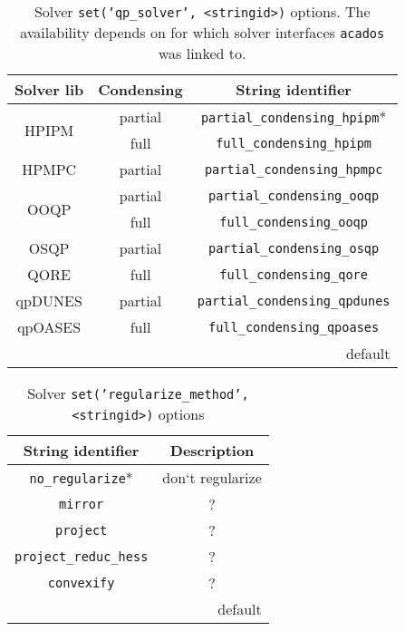 \documentclass[english]{article}
\newcommand{\code}[1]{\texttt{#1}}
\newcommand{\str}[1]{\texttt{'#1'}}
\newcommand{\acados}{\texttt{acados}}
\begin{document}
%
\begin{table}
    \centering
    \caption{Solver \code{set(\str{qp\_solver}, <stringid>)} options. The availability depends on for which solver interfaces \acados{} was linked to.}\label{tab:solver_options:qp_solver_option}
    \begin{tabular}{c@{ }c@{}c}
        \toprule
        Solver lib & Condensing & {String identifier} \\ \midrule
        \multirow{2}{1.2cm}{\centering HPIPM} & partial & \code{partial\_condensing\_hpipm}*\\
         & full & \code{full\_condensing\_hpipm} \\[1ex]
        HPMPC & partial & \code{partial\_condensing\_hpmpc} \\[1ex]
        \multirow{2}{2cm}{\centering OOQP} & partial & \code{partial\_condensing\_ooqp} \\
         & full & \code{full\_condensing\_ooqp} \\[1ex]
        OSQP & partial & \code{partial\_condensing\_osqp} \\
        QORE & full & \code{full\_condensing\_qore} \\
        qpDUNES & partial & \code{partial\_condensing\_qpdunes} \\
        qpOASES & full & \code{full\_condensing\_qpoases} \\
        \bottomrule
        \multicolumn{3}{r}{\footnotesize * default}
    \end{tabular}
\end{table}
%
\begin{table}
    \centering
    \caption{Solver \code{set(\str{regularize\_method}, <stringid>)} options}
    \label{tab:solver_options:regularize_method}
    \begin{tabular}{cc}
        \toprule
        String identifier & Description \\\midrule
        \code{no\_regularize}* & don‘t regularize \\
        \code{mirror} & ? \\
        \code{project} & ? \\
        \code{project\_reduc\_hess} & ? \\
        \code{convexify} & ? \\
        \bottomrule
        \multicolumn{2}{r}{\footnotesize * default}
    \end{tabular}
\end{table}
\end{document}
